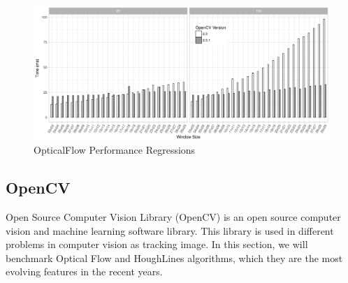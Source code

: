 
    
    
    
    
\begin{figure}[t!]
  \centering
    \includegraphics[width=1.0\columnwidth]{figures/opticalflow-regressions.png}
    \caption{OpticalFlow Performance Regressions}
    \label{fig:opticalflow-regressions}
    \vspace{-10pt}
\end{figure}
\subsection{\textbf{OpenCV}}
Open Source Computer Vision Library (OpenCV) is an open source computer vision and machine learning software library. This library is used in different problems in computer vision as tracking image. In this section, we will benchmark Optical Flow and HoughLines algorithms, which they are the most evolving features in the recent years.

